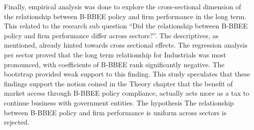 Finally, empirical analysis was done to explore the cross-sectional dimension of the relationship between B-BBEE policy and firm performance in the long term. This related to the research sub question “Did the relationship between B-BBEE policy and firm performance differ across sectors?”. The descriptives, as mentioned, already hinted towards cross sectional effects. The regression analysis per sector proved that the long term relationship for Industrials was most pronounced, with coefficients of B-BBEE rank significantly negative. The bootstrap provided weak support to this finding. This study speculates that these findings support the notion coined in the Theory chapter that the benefit of market access through B-BBEE policy compliance, actually acts more as a tax to continue business with government entities. The hypothesis The relationship between B-BBEE policy and firm performance is uniform across sectors is rejected.
